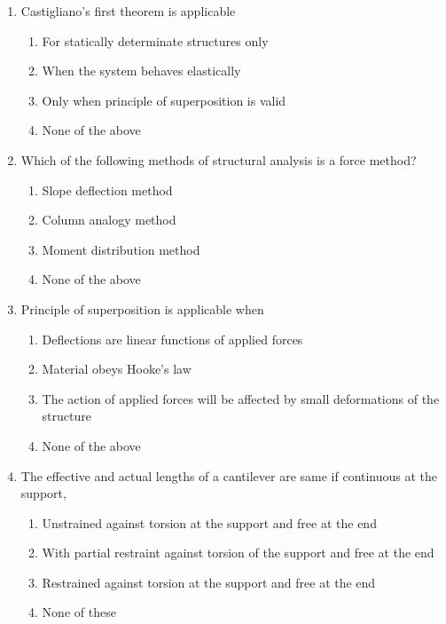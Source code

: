 \documentclass[11pt,a4paper]{article}
\begin{document}
\begin{enumerate}
\item{Castigliano's first theorem is applicable
}
\begin{enumerate}[label=\Alph*.]
\item{For statically determinate structures only}
\item{When the system behaves elastically}
\item{Only when principle of superposition is valid}
\item{None of the above}
\end{enumerate}
\item{Which of the following methods of structural analysis is a force method?}
\begin{enumerate}[label=\Alph*.]
\item{Slope deflection method}
\item{Column analogy method}
\item{Moment distribution method}
\item{None of the above}
\end{enumerate}
\item{Principle of superposition is applicable when}
\begin{enumerate}[label=\Alph*.]
\item{Deflections are linear functions of applied forces}
\item{Material obeys Hooke's law}
\item{The action of applied forces will be affected by small deformations of the structure}
\item{None of the above}
\end{enumerate}
\item{The effective and actual lengths of a cantilever are same if continuous at the support,}
\begin{enumerate}[label=\Alph*.]
\item{Unstrained against torsion at the support and free at the end}
\item{With partial restraint against torsion of the support and free at the end}
\item{Restrained against torsion at the support and free at the end}
\item{None of these}
\end{enumerate}

\end{enumerate}
\end{document}
